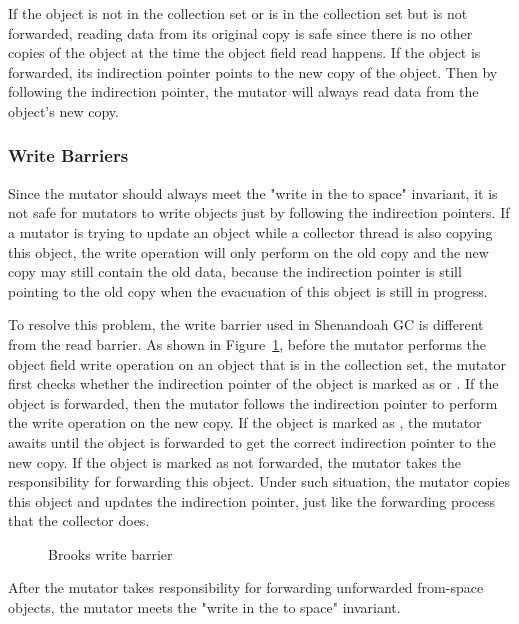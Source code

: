 If the object is not in the collection set or is in the collection set but is not forwarded,
reading data from its original copy is safe since there is no other copies of the object
at the time the object field read happens.
If the object is forwarded, its indirection pointer points to the new copy of the object.
Then by following the indirection pointer, the mutator will always read data from the object's new copy.

\subsubsection{Write Barriers}

Since the mutator should always meet the "write in the to space" invariant,
it is not safe for mutators to write objects just by following the indirection pointers.
If a mutator is trying to update an object while a collector thread is also copying
this object, the write operation will only perform on the old copy and the new copy may still contain the
old data, because the indirection pointer is still pointing to the old copy when
the evacuation of this object is still in progress.

To resolve this problem, the write barrier used in Shenandoah GC is different from the
read barrier. As shown in Figure~\ref{fig:brookswritebarrier}, before the mutator
performs the object field write operation on an object that is in the collection set,
the mutator first checks whether the indirection pointer of the object is marked as 
or . If the object is forwarded, then the mutator follows
the indirection pointer to perform the write operation on the new copy.
If the object is marked as , the mutator awaits until the object is forwarded to
get the correct indirection pointer to the new copy.
If the object is marked as not forwarded, the mutator takes the responsibility for forwarding this object.
Under such situation, the mutator copies this object and updates the indirection pointer,
just like the forwarding process that the collector does.

\begin{figure}
  \centering
  
  \caption{Brooks write barrier}
  \label{fig:brookswritebarrier}
\end{figure}

After the mutator takes responsibility for forwarding unforwarded from-space objects,
the mutator meets the "write in the to space" invariant. 

